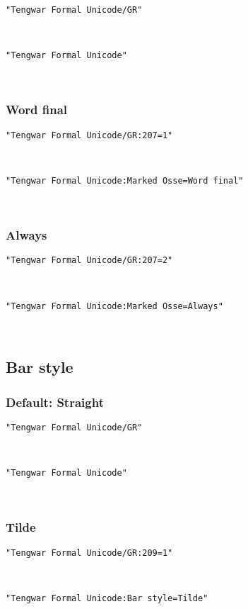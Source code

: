 \documentclass[11pt,a4paper]{article}
\begin{document}
\texttt{"Tengwar Formal Unicode/GR"}

\formalGR 

\noindent \texttt{"Tengwar Formal Unicode"}

\formalAAT 

\subsubsection{Word final}

\texttt{"Tengwar Formal Unicode/GR:207=1"}

\formalGRossefinal 

\noindent \texttt{"Tengwar Formal Unicode:Marked Osse=Word final"}

\formalAATossefinal 

\subsubsection{Always}

\texttt{"Tengwar Formal Unicode/GR:207=2"}

\formalGRossealways 

\noindent \texttt{"Tengwar Formal Unicode:Marked Osse=Always"}

\formalAATossealways 


\subsection{Bar style}

\subsubsection{Default: Straight}

\texttt{"Tengwar Formal Unicode/GR"}

\formalGR 

\noindent \texttt{"Tengwar Formal Unicode"}

\formalAAT 

\subsubsection{Tilde}

\texttt{"Tengwar Formal Unicode/GR:209=1"}

\formalGRtilde 

\noindent \texttt{"Tengwar Formal Unicode:Bar style=Tilde"}
\end{document}
